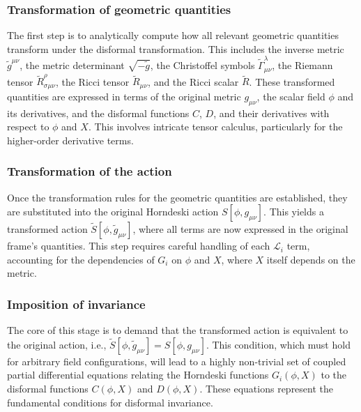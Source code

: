 \documentclass[twocolumn]{aastex631}
\begin{document}
\subsubsection{Transformation of geometric quantities}
The first step is to analytically compute how all relevant geometric quantities transform under the disformal transformation. This includes the inverse metric $\tilde{g}^{\mu\nu}$, the metric determinant $\sqrt{-\tilde{g}}$, the Christoffel symbols $\tilde{\Gamma}^\lambda_{\mu\nu}$, the Riemann tensor $\tilde{R}^\rho_{\sigma\mu\nu}$, the Ricci tensor $\tilde{R}_{\mu\nu}$, and the Ricci scalar $\tilde{R}$. These transformed quantities are expressed in terms of the original metric $g_{\mu\nu}$, the scalar field $\phi$ and its derivatives, and the disformal functions $C$, $D$, and their derivatives with respect to $\phi$ and $X$. This involves intricate tensor calculus, particularly for the higher-order derivative terms.

\subsubsection{Transformation of the action}
Once the transformation rules for the geometric quantities are established, they are substituted into the original Horndeski action $S[\phi, g_{\mu\nu}]$. This yields a transformed action $\tilde{S}[\phi, \tilde{g}_{\mu\nu}]$, where all terms are now expressed in the original frame's quantities. This step requires careful handling of each $\mathcal{L}_i$ term, accounting for the dependencies of $G_i$ on $\phi$ and $X$, where $X$ itself depends on the metric.

\subsubsection{Imposition of invariance}
The core of this stage is to demand that the transformed action is equivalent to the original action, i.e., $\tilde{S}[\phi, \tilde{g}_{\mu\nu}] = S[\phi, g_{\mu\nu}]$. This condition, which must hold for arbitrary field configurations, will lead to a highly non-trivial set of coupled partial differential equations relating the Horndeski functions $G_i(\phi, X)$ to the disformal functions $C(\phi, X)$ and $D(\phi, X)$. These equations represent the fundamental conditions for disformal invariance.
\end{document}
